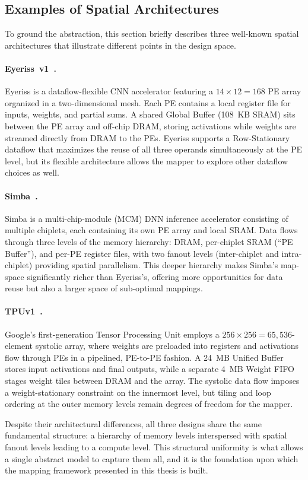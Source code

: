 \subsection{Examples of Spatial Architectures}
\label{sec:sa-examples}

To ground the abstraction, this section briefly describes three
well-known spatial architectures that illustrate different points
in the design space.

\paragraph{Eyeriss~v1~\cite{eyeriss}.}
Eyeriss is a dataflow-flexible CNN accelerator featuring a
$14 \times 12 = 168$ PE array organized in a two-dimensional mesh.
Each PE contains a local register file for inputs, weights, and partial
sums.
A shared Global Buffer (108~KB SRAM) sits between the PE array and
off-chip DRAM, storing activations while weights are streamed directly
from DRAM to the PEs.
Eyeriss supports a Row-Stationary dataflow that maximizes the reuse of
all three operands simultaneously at the PE level, but its flexible
architecture allows the mapper to explore other dataflow choices as well.

\paragraph{Simba~\cite{simba}.}
Simba is a multi-chip-module (MCM) DNN inference accelerator consisting
of multiple chiplets, each containing its own PE array and local SRAM.
Data flows through three levels of the memory hierarchy: DRAM, per-chiplet
SRAM (``PE Buffer''), and per-PE register files, with two fanout levels
(inter-chiplet and intra-chiplet) providing spatial parallelism.
This deeper hierarchy makes Simba's map-space significantly richer than
Eyeriss's, offering more opportunities for data reuse but also a larger
space of sub-optimal mappings.

\paragraph{TPUv1~\cite{tpuv1}.}
Google's first-generation Tensor Processing Unit employs a
$256 \times 256 = 65{,}536$-element systolic array, where weights are
preloaded into registers and activations flow through PEs in a
pipelined, PE-to-PE fashion.
A 24~MB Unified Buffer stores input activations and final outputs,
while a separate 4~MB Weight FIFO stages weight tiles between DRAM and
the array.
The systolic data flow imposes a weight-stationary constraint on the
innermost level, but tiling and loop ordering at the outer memory levels
remain degrees of freedom for the mapper.
\vspace{0.3em}

\noindent
Despite their architectural differences, all three designs share the
same fundamental structure: a hierarchy of memory levels interspersed
with spatial fanout levels leading to a compute level.
This structural uniformity is what allows a single abstract model to
capture them all, and it is the foundation upon which the mapping
framework presented in this thesis is built.

